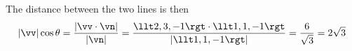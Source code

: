 \begin{solution}
\begin{itemize}
\end{itemize}
The distance between the two lines is then
\begin{equation*}
|\vv|\cos\theta = \frac{|\vv\cdot\vn|}{|\vn|}
=\frac{\llt 2,3,-1\rgt \cdot\llt 1,1,-1\rgt}{|\llt 1,1,-1\rgt|}
=\frac{6}{\sqrt{3}}
=2\sqrt{3}
\end{equation*}

\end{solution}

